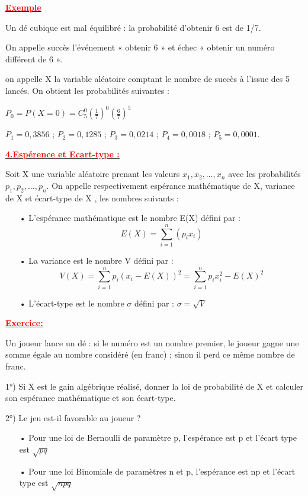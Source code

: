 \documentclass[12pt]{article}
\begin{document}
\underline{\textbf{\textcolor{red}{Exemple}}}

Un dé cubique est mal équilibré : la probabilité d’obtenir 6 est de 1/7.

On appelle succès l’événement « obtenir 6 » et échec « obtenir un numéro différent de 6 ».

on appelle X la variable aléatoire comptant le nombre de succès à l’issue des 5 lancés. On obtient les probabilités suivantes :

$P_{0}=P(X=0)=C_{5}^{0}(\frac{1}{7})^{0}(\frac{6}{7})^{5}$

$P_{1} =0,3856$ ; $P_{2} = 0,1285$ ; $P_{3} = 0,0214$ ; $P_{4} = 0,0018$ ; $P_{5} = 0,0001$.

\underline{\textbf{\textcolor{red}{4.Espérence et Ecart-type :}}}

Soit X une variable aléatoire prenant les valeurs $x_{1}, x_{2}, …, x_{n}$ avec les probabilités $p_{1}, p_{2}, …, p_{n}$. On appelle respectivement espérance mathématique de X,
variance de X et écart-type de X , les nombres suivants :
\begin{itemize}
\item[•] L’espérance mathématique est le nombre E(X) défini par : \[E(X)=\sum_{i=1}^{n}(p_{i}x_{i})\]
\item[•] La variance est le nombre V défini par :
\[V(X)=\sum_{i=1}^{n}p_{i}(x_{i}-E(X))^{2}=\sum_{i=1}^{n}p_{i}x_{i}^{2}-E(X)^{2}\]
\item[•]  L’écart-type est le nombre $\sigma$ défini par : $\sigma = \sqrt{V}$
\end{itemize}
\underline{\textbf{\textcolor{red}{Exercice:}}}

Un joueur lance un dé : si le numéro est un nombre premier, le joueur gagne une somme égale au nombre considéré (en franc) ; sinon il perd ce même nombre de franc.

1°) Si X est le gain algébrique réalisé, donner la loi de probabilité de X et calculer son espérance mathématique et son écart-type.

2°) Le jeu est-il favorable au joueur ?

\begin{itemize}
\item[•] Pour une loi de Bernoulli de paramètre p, l’espérance est p et l’écart type est $\sqrt{pq}$
\item[•] Pour une loi Binomiale de paramètres n et p, l’espérance est np et l’écart type est 
$\sqrt{npq} $
\end{itemize}
\end{document}
